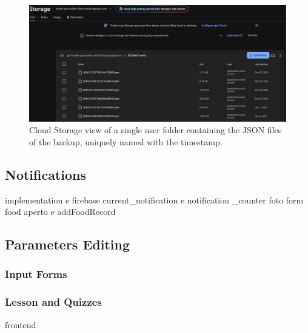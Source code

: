 \begin{figure}
    \includegraphics[width=1.0\linewidth]{./images/backup_user.jpg}
    \caption{Cloud Storage view of a single user folder containing the JSON files of the backup, uniquely named with the timestamp.}
\end{figure}

\subsection{Notifications}
\label{subsec:notifications}

implementation e firebase current\_notification e notification \_counter
foto form food aperto e addFoodRecord
\subsection{Parameters Editing}
\subsubsection{Input Forms}
\subsubsection{Lesson and Quizzes}
frontend 
